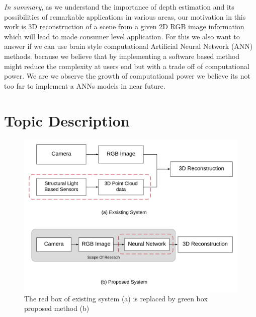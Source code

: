 \textit{In summary}, as we understand the importance of depth estimation and its possibilities of remarkable applications in various areas, our motivation in this work is 3D reconstruction of a scene from a given 2D RGB image information which will lead to made consumer level application. For this we also want to answer if we can use brain style computational Artificial Neural Network (ANN) methods. because we believe that by implementing a software based method might reduce the complexity at users end but with a trade off of computational power. We are we observe the growth of computational power we believe its not too far to implement a ANNs models in near future. 



\section{Topic Description}
\label{Chapeter1:Topic_Description}
\begin{figure}[h]
    \centering
    \includegraphics[width = 12cm]{Figures/idea.png}
    \caption{The red box of existing system (a) is replaced by green box proposed method (b)}
    \label{fig:Proposed_Model}
\end{figure}{}
